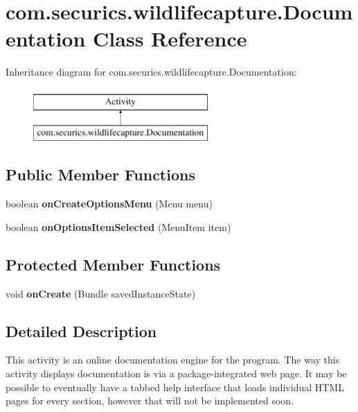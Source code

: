 \section{com.\+securics.\+wildlifecapture.\+Documentation Class Reference}
\label{classcom_1_1securics_1_1wildlifecapture_1_1_documentation}
Inheritance diagram for com.\+securics.\+wildlifecapture.\+Documentation\+:\begin{figure}[H]
\begin{center}
\leavevmode
\includegraphics[height=2.000000cm]{classcom_1_1securics_1_1wildlifecapture_1_1_documentation}
\end{center}
\end{figure}
\subsection*{Public Member Functions}
\begin{DoxyCompactItemize}
\item 
boolean {\bf on\+Create\+Options\+Menu} (Menu menu)
\item 
boolean {\bf on\+Options\+Item\+Selected} (Menu\+Item item)
\end{DoxyCompactItemize}
\subsection*{Protected Member Functions}
\begin{DoxyCompactItemize}
\item 
void {\bf on\+Create} (Bundle saved\+Instance\+State)
\end{DoxyCompactItemize}


\subsection{Detailed Description}
This activity is an online documentation engine for the program. The way this activity displays documentation is via a package-\/integrated web page. It may be possible to eventually have a tabbed help interface that loads individual H\+T\+M\+L pages for every section, however that will not be implemented soon. 

